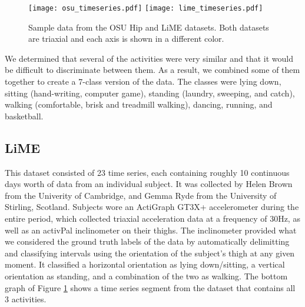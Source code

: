 \begin{figure}
 \centering
 \texttt{[image: osu\_timeseries.pdf]}
 \texttt{[image: lime\_timeseries.pdf]}
 \caption{Sample data from the OSU Hip and LiME datasets. Both datasets are
 triaxial and each axis is shown in a different color.}
 \label{fig:timeseries}
\end{figure}


We determined that several of the activities were very similar and that it would
be difficult to discriminate between them. As a result, we combined some of them together to
create a 7-class version of the data.
The classes were lying down, sitting (hand-writing, computer game),
standing (laundry, sweeping, and catch), walking (comfortable, brisk and treadmill walking),
dancing, running, and basketball.

\subsection{LiME}
This dataset consisted of 23 time series, each containing roughly 10 continuous
days worth of data from an individual subject. It was collected by Helen Brown from
the Univerity of Cambridge, and Gemma Ryde from the University of Stirling, Scotland.
Subjects wore an ActiGraph GT3X+
accelerometer during the entire period, which collected triaxial acceleration data at a frequency
of 30Hz, as well as an activPal inclinometer on their thighs. The inclinometer
provided what we considered the ground truth labels of the data by automatically
delimitting and classifying intervals using the orientation of the subject's thigh at any given moment. It 
classified a horizontal orientation as lying down/sitting,
a vertical orientation as standing, and a combination of the two as walking.
The bottom graph of Figure \ref{fig:timeseries} shows a time series segment
from the dataset that contains all 3 activities.

